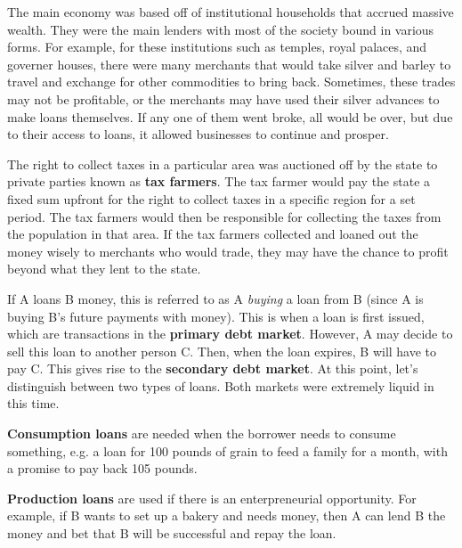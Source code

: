 \documentclass{article}
\begin{document}
    The main economy was based off of institutional households that accrued massive wealth. They were the main lenders with most of the society bound in various forms. For example, for these institutions such as temples, royal palaces, and governer houses, there were many merchants that would take silver and barley to travel and exchange for other commodities to bring back. Sometimes, these trades may not be profitable, or the merchants may have used their silver advances to make loans themselves. If any one of them went broke, all would be over, but due to their access to loans, it allowed businesses to continue and prosper.  

    \begin{example}
      The right to collect taxes in a particular area was auctioned off by the state to private parties known as \textbf{tax farmers}. The tax farmer would pay the state a fixed sum upfront for the right to collect taxes in a specific region for a set period. The tax farmers would then be responsible for collecting the taxes from the population in that area. If the tax farmers collected and loaned out the money wisely to merchants who would trade, they may have the chance to profit beyond what they lent to the state. 
    \end{example}

    If A loans B money, this is referred to as A \textit{buying} a loan from B (since A is buying B's future payments with money). This is when a loan is first issued, which are transactions in the \textbf{primary debt market}. However, A may decide to sell this loan to another person C. Then, when the loan expires, B will have to pay C. This gives rise to the \textbf{secondary debt market}. At this point, let's distinguish between two types of loans. Both markets were extremely liquid in this time. 

    \begin{definition}
      \textbf{Consumption loans} are needed when the borrower needs to consume something, e.g. a loan for 100 pounds of grain to feed a family for a month, with a promise to pay back 105 pounds.  
    \end{definition}

    \begin{definition}
      \textbf{Production loans} are used if there is an enterpreneurial opportunity. For example, if B wants to set up a bakery and needs money, then A can lend B the money and bet that B will be successful and repay the loan.  
    \end{definition}
\end{document}
